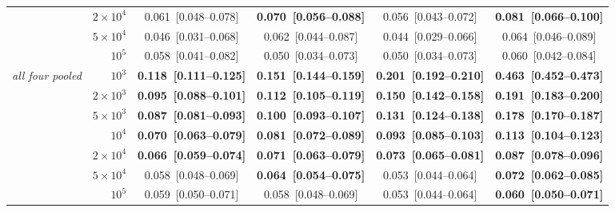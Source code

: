 \begin{table}[p]
{\begin{tabular}{lrcccc}
 & $2\times10^4$ & 0.061~[0.048--0.078] & \textbf{0.070~[0.056--0.088]} & 0.056~[0.043--0.072] & \textbf{0.081~[0.066--0.100]} \\
 & $5\times10^4$ & 0.046~[0.031--0.068] & 0.062~[0.044--0.087] & 0.044~[0.029--0.066] & 0.064~[0.046--0.089] \\
 & $10^5$ & 0.058~[0.041--0.082] & 0.050~[0.034--0.073] & 0.050~[0.034--0.073] & 0.060~[0.042--0.084] \\
\midrule
\emph{all four pooled} & $10^3$ & \textbf{0.118~[0.111--0.125]} & \textbf{0.151~[0.144--0.159]} & \textbf{0.201~[0.192--0.210]} & \textbf{0.463~[0.452--0.473]} \\
 & $2\times10^3$ & \textbf{0.095~[0.088--0.101]} & \textbf{0.112~[0.105--0.119]} & \textbf{0.150~[0.142--0.158]} & \textbf{0.191~[0.183--0.200]} \\
 & $5\times10^3$ & \textbf{0.087~[0.081--0.093]} & \textbf{0.100~[0.093--0.107]} & \textbf{0.131~[0.124--0.138]} & \textbf{0.178~[0.170--0.187]} \\
 & $10^4$ & \textbf{0.070~[0.063--0.079]} & \textbf{0.081~[0.072--0.089]} & \textbf{0.093~[0.085--0.103]} & \textbf{0.113~[0.104--0.123]} \\
 & $2\times10^4$ & \textbf{0.066~[0.059--0.074]} & \textbf{0.071~[0.063--0.079]} & \textbf{0.073~[0.065--0.081]} & \textbf{0.087~[0.078--0.096]} \\
 & $5\times10^4$ & 0.058~[0.048--0.069] & \textbf{0.064~[0.054--0.075]} & 0.053~[0.044--0.064] & \textbf{0.072~[0.062--0.085]} \\
 & $10^5$ & 0.059~[0.050--0.071] & 0.058~[0.048--0.069] & 0.053~[0.044--0.064] & \textbf{0.060~[0.050--0.071]} \\
\bottomrule
\end{tabular}}
\end{table}

